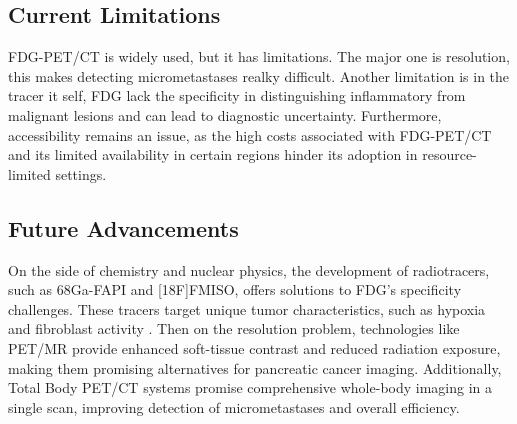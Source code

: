 \subsection{Current Limitations}

FDG-PET/CT is widely used, but it has limitations. The major one is resolution, this makes detecting micrometastases realky difficult. Another limitation is in the tracer it self, FDG lack the specificity in distinguishing inflammatory from malignant lesions and can lead to diagnostic uncertainty. Furthermore, accessibility remains an issue, as the high costs associated with FDG-PET/CT and its limited availability in certain regions hinder its adoption in resource-limited settings.

\subsection{Future Advancements}

On the side of chemistry and nuclear physics, the development of radiotracers, such as 68Ga-FAPI and [18F]FMISO, offers solutions to FDG’s specificity challenges. These tracers target unique tumor characteristics, such as hypoxia and fibroblast activity \cite{Deng2021}. Then on the resolution problem, technologies like PET/MR provide enhanced soft-tissue contrast and reduced radiation exposure, making them promising alternatives for pancreatic cancer imaging. Additionally, Total Body PET/CT systems promise comprehensive whole-body imaging in a single scan, improving detection of micrometastases and overall efficiency.
